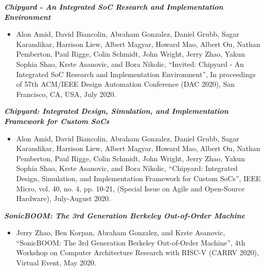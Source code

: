 \documentclass[letter]{res}
\begin{document}
\begin{resume}
\vspace{4mm} %

{\sl \textbf{Chipyard - An Integrated SoC Research and Implementation Environment}}\\

 \vspace{-4mm}

\begin{itemize}
 \item Alon Amid, David Biancolin, Abraham Gonzalez, Daniel Grubb, Sagar Karandikar, Harrison Liew, Albert Magyar, Howard Mao, Albert Ou, Nathan Pemberton, Paul Rigge, Colin Schmidt, John Wright, Jerry Zhao, Yakun Sophia Shao, Krste Asanovic, and Bora Nikolic, ``Invited: Chipyard - An Integrated SoC Research and Implementation Environment'', In proceedings of 57th ACM/IEEE Design Automation Conference (DAC 2020), San Francisco, CA, USA, July 2020.
\end{itemize}

\vspace{-2mm}

{\sl \textbf{Chipyard: Integrated Design, Simulation, and Implementation Framework for Custom SoCs}}\\

 \vspace{-4mm}

\begin{itemize}
 \item Alon Amid, David Biancolin, Abraham Gonzalez, Daniel Grubb, Sagar Karandikar, Harrison Liew, Albert Magyar, Howard Mao, Albert Ou, Nathan Pemberton, Paul Rigge, Colin Schmidt, John Wright, Jerry Zhao, Yakun Sophia Shao, Krste Asanovic, and Bora Nikolic, ``Chipyard: Integrated Design, Simulation, and Implementation Framework for Custom SoCs'', IEEE Micro, vol. 40, no. 4, pp. 10-21, (Special Issue on Agile and Open-Source Hardware), July-August 2020.
\end{itemize}

\vspace{-2mm}

{\sl \textbf{SonicBOOM: The 3rd Generation Berkeley Out-of-Order Machine}}\\

 \vspace{-4mm}

\begin{itemize}
 \item Jerry Zhao, Ben Korpan, Abraham Gonzalez, and Krste Asanovic, ``SonicBOOM: The 3rd Generation Berkeley Out-of-Order Machine'', 4th Workshop on Computer Architecture Research with RISC-V (CARRV 2020), Virtual Event, May 2020.
\end{itemize}


\end{resume}
\end{document}
